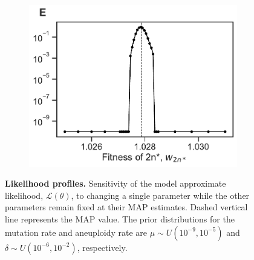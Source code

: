 \documentclass[12pt]{extarticle}
\newcommand{\likelihood}{\mathcal{L}}
\begin{document}
\begin{figure}[p]
\begin{subfigure}{0.3\textwidth}
      \includegraphics[width=\textwidth]{../figures/sensitivity-E.pdf}      
      \label{fig:sensitivity-eumt}
  \end{subfigure}
  \caption{
    \textbf{Likelihood profiles.} Sensitivity of the model approximate likelihood, $\likelihood(\theta)$, to changing a single parameter while the other parameters remain fixed at their MAP estimates. Dashed vertical line represents the MAP value. The prior distributions for the mutation rate and aneuploidy rate are $\mu \sim U(10^{-9}, 10^{-5})$ and $\delta \sim U(10^{-6}, 10^{-2})$, respectively. 
  }
  
  \label{fig:sensitivity}
\end{figure}
\end{document}
